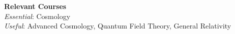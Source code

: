 \documentclass[a4paper,10pt]{article}
\begin{document}
\textbf{Relevant Courses}\\

\textit{Essential}: Cosmology\\

\textit{Useful}: Advanced Cosmology, Quantum Field Theory, General Relativity\\















\end{document}
